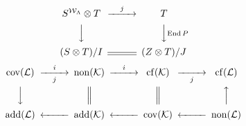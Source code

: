 \documentclass{article}
\newcommand{\End}{\operatorname{End}}
\newcommand{\cov}{\operatorname{cov}}
\newcommand{\non}{\operatorname{non}}
\newcommand{\add}{\operatorname{add}}
\newcommand{\cf}{\operatorname{cf}}
\begin{document}
\begin{equation}
\begin{CD}
S^{{\mathcal{W}}_\Lambda}\otimes T @>j>> T\\
@VVV @VV{\End P}V\\
(S\otimes T)/I @= (Z\otimes T)/J
\end{CD}
\end{equation}
\begin{equation}
\begin{CD}
\cov(\mathcal{L}) @>i>j> \non(\mathcal{K}) @)i)) \cf(\mathcal{K}) @>>j> \cf(\mathcal{L})\\
@VVV @| @\vert @AAA\\
\add(\mathcal{L}) @<<< \add(\mathcal{K}) @((( \cov(\mathcal{K}) @<<< \non(\mathcal{L})
\end{CD}
\end{equation}
\end{document}
